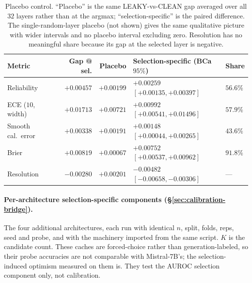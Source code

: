 \documentclass{article}
\begin{document}
\begin{table}[h]
\centering
\small
{\setlength{\tabcolsep}{4pt}
\begin{tabular}{@{}lrrll@{}}
\toprule
Metric & Gap @ sel. & Placebo & Selection-specific (BCa $95\%$) & Share \\
\midrule
Reliability & $+0.00457$ & $+0.00199$ & $+0.00259$ $[+0.00135,+0.00397]$ & $56.6\%$ \\
ECE ($10$, width) & $+0.01713$ & $+0.00721$ & $+0.00992$ $[+0.00541,+0.01496]$ & $57.9\%$ \\
Smooth cal.\ error & $+0.00338$ & $+0.00191$ & $+0.00148$ $[+0.00044,+0.00265]$ & $43.6\%$ \\
Brier & $+0.00819$ & $+0.00067$ & $+0.00752$ $[+0.00537,+0.00962]$ & $91.8\%$ \\
Resolution & $-0.00280$ & $+0.00201$ & $-0.00482$ $[-0.00658,-0.00306]$ & --- \\
\bottomrule
\end{tabular}}
\caption{Placebo control. ``Placebo'' is the same LEAKY-vs-CLEAN gap averaged
over all $32$ layers rather than at the argmax; ``selection-specific'' is the
paired difference. The single-random-layer placebo (not shown) gives the same
qualitative picture with wider intervals and no placebo interval excluding
zero. Resolution has no meaningful share because its gap at the selected layer
is negative.}
\label{tab:placebo}
\end{table}

\paragraph{Per-architecture selection-specific components
(\S\ref{sec:calibration-bridge}).} The four additional architectures, each run
with identical $n$, split, folds, reps, seed and probe, and with the machinery
imported from the same script. $K$ is the candidate count. These caches are
forced-choice rather than generation-labeled, so their probe accuracies are not
comparable with Mistral-7B's; the selection-induced optimism measured on them
is. They test the AUROC selection component only, not calibration.
\end{document}
